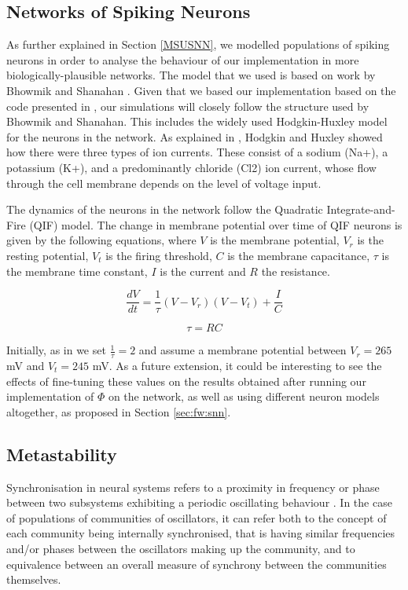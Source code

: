 \documentclass[a4paper,11pt]{article}
\begin{document}
\subsection{Networks of Spiking Neurons}
\label{sec:bg:snn}
As further explained in Section \ref{MSUSNN}, we modelled populations of spiking neurons in order to analyse the behaviour of our implementation in more biologically-plausible networks. The model that we used is based on work by Bhowmik and Shanahan \cite{Bhowmik2013}. Given that we based our implementation based on the code presented in \cite{Bhowmik2013}, our simulations will closely follow the structure used by Bhowmik and Shanahan. This includes the widely used Hodgkin-Huxley model \cite{Hodgkin1952} for the neurons in the network. As explained in \cite{Bhowmik2013}, Hodgkin and Huxley showed how there were three types of ion currents. These consist of a sodium (Na+), a potassium (K+), and a predominantly chloride (Cl2) ion current, whose flow through the cell membrane depends on the level of voltage input.

The dynamics of the neurons in the network follow the Quadratic Integrate-and-Fire (QIF) model. The change in membrane potential over time of QIF neurons is given by the following equations, where $V$ is the membrane potential, $V_r$ is the resting potential, $V_t$ is the firing threshold, $C$ is the membrane capacitance, $\tau$ is the membrane time  constant, $I$ is the current and $R$ the resistance.

\begin{equation} \label{eq:qif}
\frac{dV}{dt} = \frac{1}{\tau}(V - V_ r)(V-V_t) +  \frac{I}{C}
\end{equation}

\begin{equation} \label{eq:tau}
\tau = RC
\end{equation}

Initially, as in \cite{Bhowmik2013} we set $\frac{1}{\tau} = 2$ and assume a membrane potential between $V_r = 265$ mV and $V_t = 245$ mV. As a future extension, it could be interesting to see the effects of fine-tuning these values on the results obtained after running our implementation of $\Phi$ on the network, as well as using different neuron models altogether, as proposed in Section \ref{sec:fw:snn}.

\subsection{Metastability}
\label{sec:bg:meta}
Synchronisation in neural systems refers to a proximity in frequency or phase between two subsystems exhibiting a periodic oscillating behaviour \cite{Abarbanel1996}. In the case of populations of communities of oscillators, it can refer both to the concept of each community being internally synchronised, that is having similar frequencies and/or phases between the oscillators making up the community, and to equivalence between an overall measure of synchrony between the communities themselves.
\end{document}
